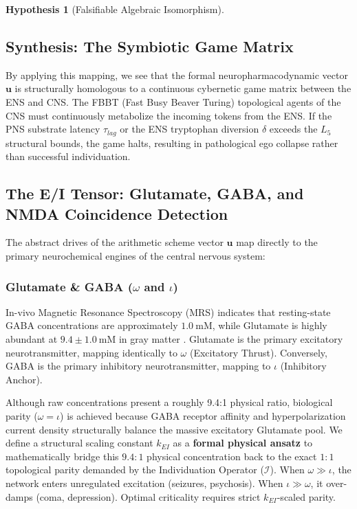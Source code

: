 \documentclass[12pt,oneside]{article}
\theoremstyle{principia}
\theoremstyle{definition}
\newtheorem{hypothesis}[theorem]{Hypothesis}
\theoremstyle{remark}
\begin{document}
\begin{hypothesis}[Falsifiable Algebraic Isomorphism]
\subsection*{Synthesis: The Symbiotic Game Matrix}

By applying this mapping, we see that the formal neuropharmacodynamic vector $\mathbf{u}$ is structurally homologous to a continuous cybernetic game matrix between the ENS and CNS. The FBBT (Fast Busy Beaver Turing) topological agents of the CNS must continuously metabolize the incoming tokens from the ENS. If the PNS substrate latency $\tau_{lag}$ or the ENS tryptophan diversion $\delta$ exceeds the $L_5$ structural bounds, the game halts, resulting in pathological ego collapse rather than successful individuation.
\end{hypothesis}

\subsection{The E/I Tensor: Glutamate, GABA, and NMDA Coincidence Detection}

The abstract drives of the arithmetic scheme vector $\mathbf{u}$ map directly to the primary neurochemical engines of the central nervous system:

\subsubsection{Glutamate \& GABA (\texorpdfstring{$\omega$ and $\iota$}{\omega and \iota})}
In-vivo Magnetic Resonance Spectroscopy (MRS) indicates that resting-state GABA concentrations are approximately $1.0\:\mathrm{mM}$, while Glutamate is highly abundant at $9.4 \pm 1.0\:\mathrm{mM}$ in gray matter \cite{mrs_glutamate}. Glutamate is the primary excitatory neurotransmitter, mapping identically to $\omega$ (Excitatory Thrust). Conversely, GABA is the primary inhibitory neurotransmitter, mapping to $\iota$ (Inhibitory Anchor). 

Although raw concentrations present a roughly 9.4:1 physical ratio, biological parity ($\omega = \iota$) is achieved because GABA receptor affinity and hyperpolarization current density structurally balance the massive excitatory Glutamate pool. We define a structural scaling constant $k_{EI}$ as a \textbf{formal physical ansatz} to mathematically bridge this $9.4:1$ physical concentration back to the exact $1:1$ topological parity demanded by the Individuation Operator ($\mathcal{I}$). When $\omega \gg \iota$, the network enters unregulated excitation (seizures, psychosis). When $\iota \gg \omega$, it over-damps (coma, depression). Optimal criticality requires strict $k_{EI}$-scaled parity.
\end{document}
